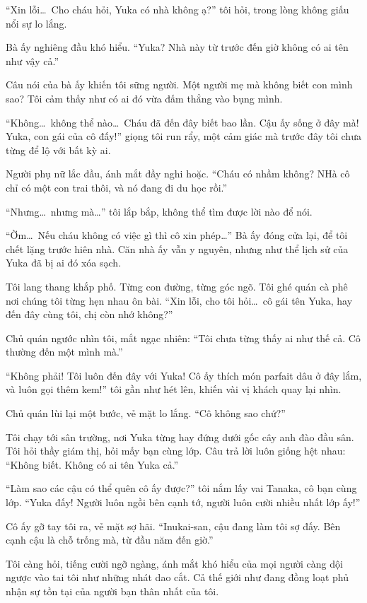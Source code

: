 \documentclass[../main.tex]{subfiles}
\begin{document}
``Xin lỗi\dots\ Cho cháu hỏi, Yuka có nhà không ạ?'' tôi hỏi, trong lòng không giấu nổi sự lo lắng.

Bà ấy nghiêng đầu khó hiểu. ``Yuka? Nhà này từ trước đến giờ không có ai tên như vậy cả.''

Câu nói của bà ấy khiến tôi sững người. Một người mẹ mà không biết con mình sao? Tôi cảm thấy như có ai đó vừa đấm thẳng vào bụng mình.

``Không\dots\ không thể nào\dots\ Cháu đã đến đây biết bao lần. Cậu ấy sống ở đây mà! Yuka, con gái của cô đấy!'' giọng tôi run rẩy, một cảm giác mà trước đây tôi chưa từng để lộ với bất kỳ ai.

Người phụ nữ lắc đầu, ánh mắt đầy nghi hoặc. ``Cháu có nhầm không? NHà cô chỉ có một con trai thôi, và nó đang đi du học rồi.''

``Nhưng\dots\ nhưng mà\dots'' tôi lắp bắp, không thể tìm được lời nào để nói.

``Ờm\dots\ Nếu cháu không có việc gì thì cô xin phép\dots'' Bà ấy đóng cửa lại, để tôi chết lặng trước hiên nhà. Căn nhà ấy vẫn y nguyên, nhưng như thể lịch sử của Yuka đã bị ai đó xóa sạch.

\ct

Tôi lang thang khắp phố. Từng con đường, từng góc ngõ. Tôi ghé quán cà phê nơi chúng tôi từng hẹn nhau ôn bài. ``Xin lỗi, cho tôi hỏi\dots\ cô gái tên Yuka, hay đến đây cùng tôi, chị còn nhớ không?''

Chủ quán ngước nhìn tôi, mắt ngạc nhiên: ``Tôi chưa từng thấy ai như thế cả. Cô thường đến một mình mà.''

``Không phải! Tôi luôn đến đây với Yuka! Cô ấy thích món parfait dâu ở đây lắm, và luôn gọi thêm kem!'' tôi gần như hét lên, khiến vài vị khách quay lại nhìn.

Chủ quán lùi lại một bước, vẻ mặt lo lắng. ``Cô không sao chứ?''

Tôi chạy tới sân trường, nơi Yuka từng hay đứng dưới gốc cây anh đào đầu sân. Tôi hỏi thầy giám thị, hỏi mấy bạn cùng lớp. Câu trả lời luôn giống hệt nhau: ``Không biết. Không có ai tên Yuka cả.''

``Làm sao các cậu có thể quên cô ấy được?'' tôi nắm lấy vai Tanaka, cô bạn cùng lớp. ``Yuka đấy! Người luôn ngồi bên cạnh tớ, người luôn cười nhiều nhất lớp ấy!''

Cô ấy gỡ tay tôi ra, vẻ mặt sợ hãi. ``Inukai-san, cậu đang làm tôi sợ đấy. Bên cạnh cậu là chỗ trống mà, từ đầu năm đến giờ.''

Tôi càng hỏi, tiếng cười ngỡ ngàng, ánh mắt khó hiểu của mọi người càng dội ngược vào tai tôi như những nhát dao cắt. Cả thế giới như đang đồng loạt phủ nhận sự tồn tại của người bạn thân nhất của tôi.
\end{document}
